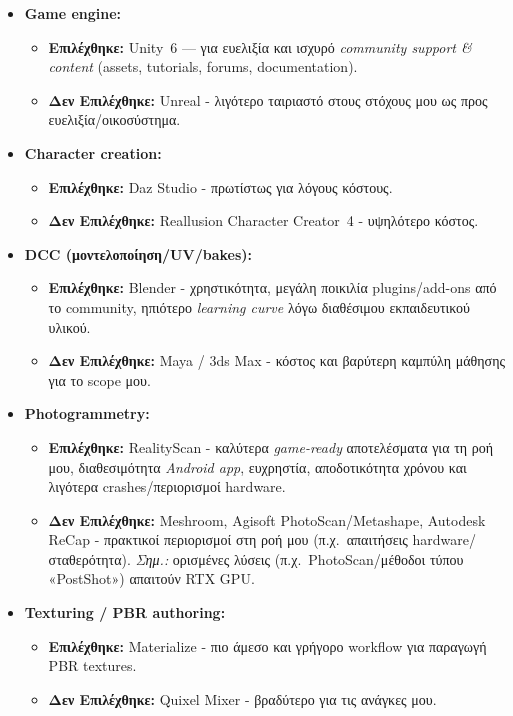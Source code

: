 \begin{itemize}
  \item \textbf{Game engine:}
  \begin{itemize}
    \item \textbf{Επιλέχθηκε:} Unity~6 — για ευελιξία και ισχυρό \textit{community support \& content} (assets, tutorials, forums, documentation).
    \item \textbf{Δεν Επιλέχθηκε:} Unreal - λιγότερο ταιριαστό στους στόχους μου ως προς ευελιξία/οικοσύστημα.
  \end{itemize}

  \item \textbf{Character creation:}
  \begin{itemize}
    \item \textbf{Επιλέχθηκε:} Daz Studio - πρωτίστως για λόγους κόστους.
    \item \textbf{Δεν Επιλέχθηκε:} Reallusion Character Creator~4 - υψηλότερο κόστος.
  \end{itemize}

  \item \textbf{DCC (μοντελοποίηση/UV/bakes):}
  \begin{itemize}
    \item \textbf{Επιλέχθηκε:} Blender - χρηστικότητα, μεγάλη ποικιλία plugins/add-ons από το community, ηπιότερο \textit{learning curve} λόγω διαθέσιμου εκπαιδευτικού υλικού.
    \item \textbf{Δεν Επιλέχθηκε:} Maya / 3ds Max - κόστος και βαρύτερη καμπύλη μάθησης για το scope μου.
  \end{itemize}

  \item \textbf{Photogrammetry:}
  \begin{itemize}
    \item \textbf{Επιλέχθηκε:} RealityScan - καλύτερα \textit{game-ready} αποτελέσματα για τη ροή μου, διαθεσιμότητα \textit{Android app}, ευχρηστία, αποδοτικότητα χρόνου και λιγότερα crashes/περιορισμοί hardware.
    \item \textbf{Δεν Επιλέχθηκε:} Meshroom, Agisoft PhotoScan/Metashape, Autodesk ReCap - πρακτικοί περιορισμοί στη ροή μου (π.χ.\ απαιτήσεις hardware/σταθερότητα). \textit{Σημ.:} ορισμένες λύσεις (π.χ.\ PhotoScan/μέθοδοι τύπου «PostShot») απαιτούν RTX GPU.
  \end{itemize}

  \item \textbf{Texturing / PBR authoring:}
  \begin{itemize}
    \item \textbf{Επιλέχθηκε:} Materialize - πιο άμεσο και γρήγορο workflow για παραγωγή PBR textures.
    \item \textbf{Δεν Επιλέχθηκε:} Quixel Mixer - βραδύτερο για τις ανάγκες μου.
  \end{itemize}


\end{itemize}
